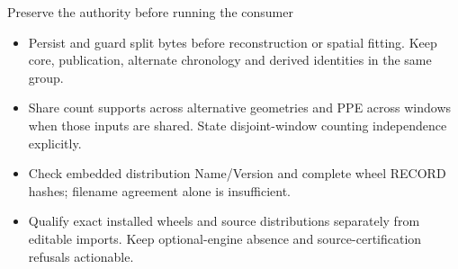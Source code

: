 \begin{frame}{Preserve the authority before running the consumer}
\begin{itemize}
\item Persist and guard split bytes before reconstruction or spatial fitting. Keep core, publication, alternate chronology and derived identities in the same group.
\item Share count supports across alternative geometries and PPE across windows when those inputs are shared. State disjoint-window counting independence explicitly.
\item Check embedded distribution Name/Version and complete wheel RECORD hashes; filename agreement alone is insufficient.
\item Qualify exact installed wheels and source distributions separately from editable imports. Keep optional-engine absence and source-certification refusals actionable.
\end{itemize}
\end{frame}


